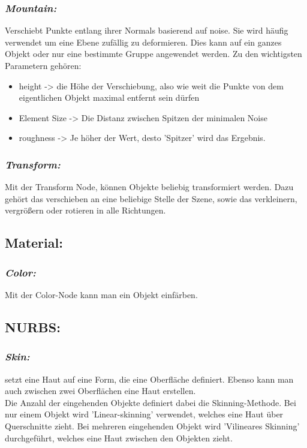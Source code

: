 \documentclass[paper=a4,fontsize=12pt,ngerman]{scrartcl}
\begin{document}
	\subsubsection*{\textit{Mountain:}}
	Verschiebt Punkte entlang ihrer Normals basierend auf noise. Sie wird häufig verwendet um eine Ebene zufällig zu deformieren. Dies kann auf ein ganzes Objekt oder nur eine bestimmte Gruppe angewendet werden. Zu den wichtigsten Parametern gehören:
	\begin{itemize}
		\item height -> die Höhe der Verschiebung, also wie weit die Punkte von dem eigentlichen Objekt maximal entfernt sein dürfen
		\item Element Size -> Die Distanz zwischen Spitzen der minimalen Noise
		\item roughness -> Je höher der Wert, desto 'Spitzer' wird das Ergebnis.
	\end{itemize}
	\subsubsection*{\textit{Transform:}}
	Mit der Transform Node, können Objekte beliebig transformiert werden. Dazu gehört das verschieben an eine beliebige Stelle der Szene, sowie das verkleinern, vergrößern oder rotieren in alle Richtungen.
	
	\subsection*{Material:}
	\subsubsection*{\textit{Color:}}
	Mit der Color-Node kann man ein Objekt einfärben.
	
	\subsection*{NURBS:}
	\subsubsection*{\textit{Skin:}}
	setzt eine Haut auf eine Form, die eine Oberfläche definiert. Ebenso kann man auch zwischen zwei Oberflächen eine Haut erstellen.\\ 
	Die Anzahl der eingehenden Objekte definiert dabei die Skinning-Methode. Bei nur einem Objekt wird 'Linear-skinning' verwendet, welches eine Haut über Querschnitte zieht. Bei mehreren eingehenden Objekt wird 'Vilineares Skinning' durchgeführt, welches eine Haut zwischen den Objekten zieht.
	
\end{document}
